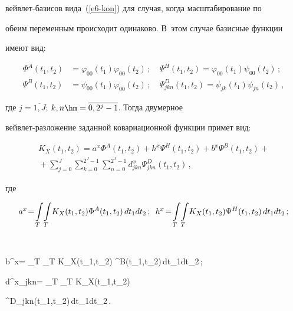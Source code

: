 вейв\-лет-ба\-зи\-сов вида~(\ref{e6-kon}) для случая, когда масштабирование по 


обеим переменным происходит одинаково. В~этом случае базисные функции 


имеют вид:


  \begin{align*}


  \Phi^A(t_1,t_2) &= \varphi_{00}(t_1) \varphi_{00}(t_2)\,;\quad 


\Psi^H(t_1,t_2)=\varphi_{00}(t_1)\psi_{00}(t_2)\,;\\


  \Psi^B(t_1,t_2) &= \psi_{00}(t_1)\varphi_{00}(t_2)\,;\quad 


\Psi^D_{jkn}(t_1,t_2)= \psi_{jk}(t_1) \psi_{jn}(t_2)\,,




  \end{align*}


где $j=\overline{1,J}$; $k,n\hm= \overline{0, 2^j-1}$. Тогда двумерное  


вейв\-лет-раз\-ло\-же\-ние заданной ковариационной функции примет вид:


\begin{multline*}


K_X(t_1,t_2) =a^x\Phi^A(t_1,t_2) +h^x\Psi^H(t_1,t_2) +b^x \Psi^B (t_1,t_2) 


+{}\\


{}+\sum\limits^J_{j=0} \sum\limits_{k=0}^{2^J-1} \sum\limits_{n=0}^{2^J-1} 


d^x_{jkn} \Psi^D_{jkn} (t_1,t_2)\,,




\end{multline*}


  где 


  $$


  a^x\! =\!\int\limits_T \!\int\limits_T\! K_X(t_1,t_2) \Phi^A (t_1,t_2)\,dt_1dt_2\,;\enskip 


h^x\!=\!\int\limits_T \!\int\limits_T \!K_X(t_1,t_2) \Psi^H(t_1, t_2)\,dt_1dt_2\,;


  $$


  $$


  b^x\!=\! \int\limits_T \!\int\limits_T \!K_X(t_1,t_2) \Psi^B(t_1,t_2)\,dt_1dt_2\,;\enskip 


d^x_{jkn}\!= \!\int\limits_T \!\int\limits_T \!K_X(t_1,t_2) 


\Psi^D_{jkn}(t_1,t_2)\,dt_1dt_2\,.



